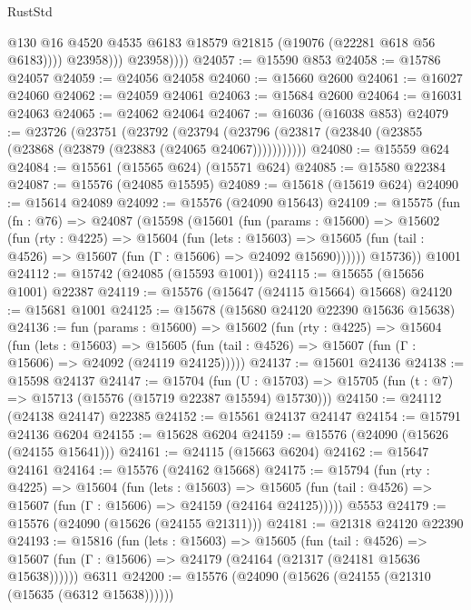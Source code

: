 \begin{lexlean}{RustStd}
\begin{coremodule}
                      @130
                      @16
                      @4520
                      @4535
                      @6183
                      @18579
                      @21815
                      (@19076 (@22281 @618 @56 @6183))))
                  @23958)))
            @23958))))
@24057 := @15590 @853
@24058 := @15786 @24057
@24059 := @24056 @24058
@24060 := @15660 @2600
@24061 := @16027 @24060
@24062 := @24059 @24061
@24063 := @15684 @2600
@24064 := @16031 @24063
@24065 := @24062 @24064
@24067 := @16036 (@16038 @853)
@24079 := @23726
    (@23751
      (@23792
        (@23794 (@23796 (@23817 (@23840 (@23855 (@23868 (@23879 (@23883 (@24065 @24067)))))))))))
@24080 := @15559 @624
@24084 := @15561 (@15565 @624) (@15571 @624)
@24085 := @15580 @22384
@24087 := @15576 (@24085 @15595)
@24089 := @15618 (@15619 @624)
@24090 := @15614 @24089
@24092 := @15576 (@24090 @15643)
@24109 := @15575
    (fun (fn : @76) =>
    @24087
      (@15598
        (@15601
          (fun (params : @15600) =>
          @15602
            (fun (rty : @4225) =>
            @15604
              (fun (lets : @15603) =>
              @15605 (fun (tail : @4526) => @15607 (fun (Γ : @15606) => @24092 @15690))))))
        @15736))
    @1001
@24112 := @15742 (@24085 (@15593 @1001))
@24115 := @15655 (@15656 @1001) @22387
@24119 := @15576 (@15647 (@24115 @15664) @15668)
@24120 := @15681 @1001
@24125 := @15678 (@15680 @24120 @22390 @15636 @15638)
@24136 := fun (params : @15600) =>
  @15602
    (fun (rty : @4225) =>
    @15604
      (fun (lets : @15603) =>
      @15605 (fun (tail : @4526) => @15607 (fun (Γ : @15606) => @24092 (@24119 @24125)))))
@24137 := @15601 @24136
@24138 := @15598 @24137
@24147 := @15704
    (fun (U : @15703) => @15705 (fun (t : @7) => @15713 (@15576 (@15719 @22387 @15594) @15730)))
@24150 := @24112 (@24138 @24147) @22385
@24152 := @15561 @24137 @24147
@24154 := @15791 @24136 @6204
@24155 := @15628 @6204
@24159 := @15576 (@24090 (@15626 (@24155 @15641)))
@24161 := @24115 (@15663 @6204)
@24162 := @15647 @24161
@24164 := @15576 (@24162 @15668)
@24175 := @15794
    (fun (rty : @4225) =>
    @15604
      (fun (lets : @15603) =>
      @15605 (fun (tail : @4526) => @15607 (fun (Γ : @15606) => @24159 (@24164 @24125)))))
    @5553
@24179 := @15576 (@24090 (@15626 (@24155 @21311)))
@24181 := @21318 @24120 @22390
@24193 := @15816
    (fun (lets : @15603) =>
    @15605
      (fun (tail : @4526) =>
      @15607 (fun (Γ : @15606) => @24179 (@24164 (@21317 (@24181 @15636 @15638))))))
    @6311
@24200 := @15576 (@24090 (@15626 (@24155 (@21310 (@15635 (@6312 @15638))))))

\end{coremodule}
\end{lexlean}
